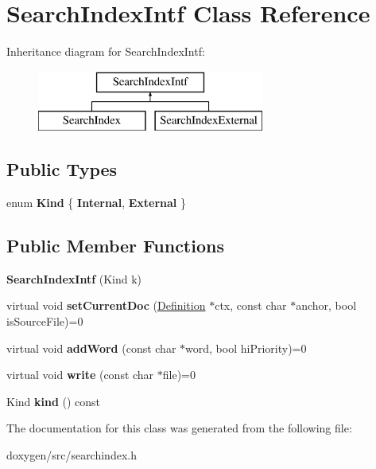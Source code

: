 \hypertarget{class_search_index_intf}{}\section{Search\+Index\+Intf Class Reference}
\label{class_search_index_intf}
Inheritance diagram for Search\+Index\+Intf\+:\begin{figure}[H]
\begin{center}
\leavevmode
\includegraphics[height=2.000000cm]{class_search_index_intf}
\end{center}
\end{figure}
\subsection*{Public Types}
\begin{DoxyCompactItemize}
\item 
\mbox{\label{class_search_index_intf_ade3dd4c1f8bc6487f0f3dccba5c6f9ea}} 
enum {\bfseries Kind} \{ {\bfseries Internal}, 
{\bfseries External}
 \}
\end{DoxyCompactItemize}
\subsection*{Public Member Functions}
\begin{DoxyCompactItemize}
\item 
\mbox{\label{class_search_index_intf_acf0114aef9108626eacc8c3fa065a46d}} 
{\bfseries Search\+Index\+Intf} (Kind k)
\item 
\mbox{\label{class_search_index_intf_afb1f4d8ad5e2f24848f902ae82e38d31}} 
virtual void {\bfseries set\+Current\+Doc} (\mbox{\hyperlink{class_definition}{Definition}} $\ast$ctx, const char $\ast$anchor, bool is\+Source\+File)=0
\item 
\mbox{\label{class_search_index_intf_abc2c1e940b5b534bbcec2b8a2356a7be}} 
virtual void {\bfseries add\+Word} (const char $\ast$word, bool hi\+Priority)=0
\item 
\mbox{\label{class_search_index_intf_a58f5360b72b2379373e3efd001b7287a}} 
virtual void {\bfseries write} (const char $\ast$file)=0
\item 
\mbox{\label{class_search_index_intf_a7cc55c10e28715c334a3e51fb5003c08}} 
Kind {\bfseries kind} () const
\end{DoxyCompactItemize}


The documentation for this class was generated from the following file\+:\begin{DoxyCompactItemize}
\item 
doxygen/src/searchindex.\+h\end{DoxyCompactItemize}
